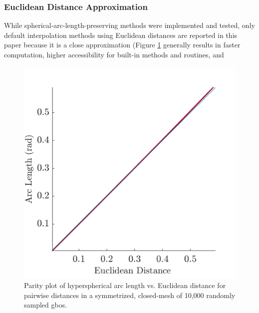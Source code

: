 \documentclass[preprint,12pt]{elsarticle}
\begin{document}
\subsubsection{Euclidean Distance Approximation}
While spherical-arc-length-preserving methods were implemented and tested, only default interpolation methods using Euclidean distances are reported in this paper because it is a close approximation (Figure \ref{fig:dist-parity} generally results in faster computation, higher accessibility for built-in methods and routines, and 

\begin{figure}
\centering
\includegraphics{dist-parity.png}
\caption{Parity plot of hyperspherical arc length vs. Euclidean distance for pairwise distances in a symmetrized, closed-mesh of 10,000 randomly sampled \glspl{gbo}.}
\label{fig:dist-parity}
\end{figure}
\end{document}
